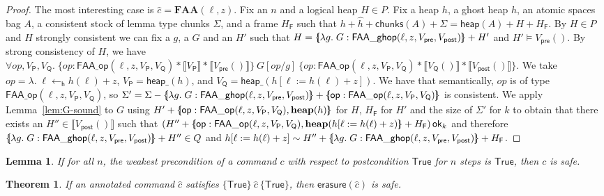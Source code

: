 \documentclass{article}
\newtheorem{theorem}{Theorem}
\newtheorem{lemma}{Lemma}
\newcommand{\llbrace}{\{\hspace{-3pt}[}
\newcommand{\rrbrace}{]\hspace{-3pt}\}}
\begin{document}
\begin{proof}
The most interesting case is $\hat{c} = \mathbf{FAA}(\ell, z)$. Fix an $n$ and a logical heap $H \in P$. Fix a heap $h$, a ghost heap $\hat{h}$, an atomic spaces bag $A$, a consistent stock of lemma type chunks $\Sigma$, and a frame $H_\mathsf{F}$ such that $h + \hat{h} + \mathsf{chunks}(A) + \Sigma = \mathsf{heap}(A) + H + H_\mathsf{F}$. By $H \in P$ and $H$ strongly consistent we can fix a $g$, a $G$ and an $H'$ such that $H = \llbrace \lambda g.\;G : \mathsf{FAA\_ghop}(\ell, z, V_\mathsf{pre}, V_\mathsf{post})\rrbrace + H'$ and $H' \vDash V_\mathsf{pre}()$. By strong consistency of $H$, we have $\forall \mathit{op}, V_\mathsf{P}, V_\mathsf{Q}.\;\{\mathit{op} : \mathsf{FAA\_op}(\ell, z, V_\mathsf{P}, V_\mathsf{Q}) * \llbracket V_\mathsf{P}\rrbracket * \llbracket V_\mathsf{pre}()\rrbracket\}\ G[\mathit{op}/g]\ \{\mathit{op} : \mathsf{FAA\_op}(\ell, z, V_\mathsf{P}, V_\mathsf{Q}) * \llbracket V_\mathsf{Q}()\rrbracket * \llbracket V_\mathsf{post}()\rrbracket\}$. We take $\mathit{op} = \lambda.\;\ell \leftarrow_\mathsf{h} h(\ell) + z$, $V_\mathsf{P} = \mathsf{heap\_}(h)$, and $V_\mathsf{Q} = \mathsf{heap\_}(h[\ell := h(\ell) + z])$. We have that semantically, $\mathit{op}$ is of type $\mathsf{FAA\_op}(\ell, z, V_\mathsf{P}, V_\mathsf{Q})$, so $\Sigma' = \Sigma - \llbrace \lambda g.\;G : \mathsf{FAA\_ghop}(\ell, z, V_\mathsf{pre}, V_\mathsf{post})\rrbrace + \llbrace \mathsf{op} : \mathsf{FAA\_op}(\ell, z, V_\mathsf{P}, V_\mathsf{Q})\rrbrace$ is consistent. We apply Lemma~\ref{lem:G-sound} to $G$ using $H' + \llbrace \mathsf{op} : \mathsf{FAA\_op}(\ell, z, V_\mathsf{P}, V_\mathsf{Q}), \mathbf{heap}(h)\rrbrace$ for $H$, $H_\mathsf{F}$ for $H'$ and the size of $\Sigma'$ for $k$ to obtain that there exists an $H'' \in \llbracket V_\mathsf{post}()\rrbracket$ such that $(H'' + \llbrace \mathsf{op} : \mathsf{FAA\_op}(\ell, z, V_\mathsf{P}, V_\mathsf{Q}), \mathbf{heap}(h[\ell:=h(\ell) + z)\rrbrace + H_\mathsf{F})\,\mathsf{ok}_k$ and therefore $\llbrace \lambda g.\;G : \mathsf{FAA\_ghop}(\ell, z, V_\mathsf{pre}, V_\mathsf{post})\rrbrace + H'' \in Q$ and $h[\ell := h(\ell) + z] \sim H'' + \llbrace \lambda g.\;G : \mathsf{FAA\_ghop}(\ell, z, V_\mathsf{pre}, V_\mathsf{post})\rrbrace + H_\mathsf{F}$.
\end{proof}

\begin{lemma}
If for all $n$, the weakest precondition of a command $c$ with respect to postcondition $\mathsf{True}$ for $n$ steps is $\mathsf{True}$, then $c$ is safe.
\end{lemma}

\begin{theorem}
If an annotated command $\hat{c}$ satisfies $\{\mathsf{True}\}\ \hat{c}\ \{\mathsf{True}\}$, then $\mathsf{erasure}(\hat{c})$ is safe.
\end{theorem}



\end{document}
